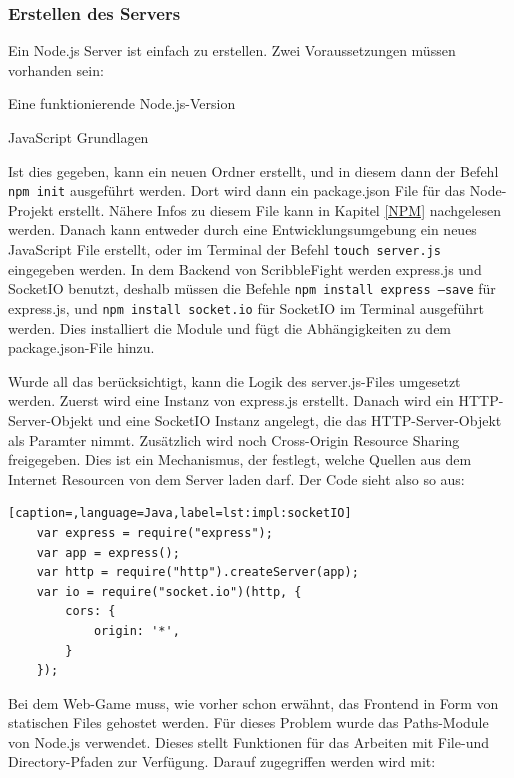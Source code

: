 \subsubsection{Erstellen des Servers}
Ein Node.js Server ist einfach zu erstellen. Zwei Voraussetzungen müssen vorhanden sein:

\begin{compactitem}
    \item Eine funktionierende Node.js-Version
    \item JavaScript Grundlagen
\end{compactitem}

Ist dies gegeben, kann ein neuen Ordner erstellt, und in diesem dann der Befehl \texttt{npm init} ausgeführt werden.
Dort wird dann ein package.json File für das Node-Projekt erstellt. Nähere Infos zu diesem File kann in Kapitel \ref{NPM} nachgelesen werden.
Danach kann entweder durch eine Entwicklungsumgebung ein neues JavaScript File erstellt, oder im Terminal der Befehl \texttt{touch server.js} eingegeben werden.
In dem Backend von ScribbleFight werden express.js und SocketIO benutzt, deshalb müssen die Befehle \texttt{npm install express --save} für express.js, und
\texttt{npm install socket.io} für SocketIO im Terminal ausgeführt werden. Dies installiert die Module und fügt die Abhängigkeiten zu dem package.json-File hinzu.

Wurde all das berücksichtigt, kann die Logik des server.js-Files umgesetzt werden. Zuerst wird eine Instanz von express.js erstellt.
Danach wird ein HTTP-Server-Objekt und eine SocketIO Instanz angelegt, die das HTTP-Server-Objekt als Paramter nimmt. Zusätzlich wird noch Cross-Origin Resource Sharing freigegeben. 
Dies ist ein Mechanismus, der festlegt, welche Quellen aus dem Internet Resourcen von dem Server laden darf. \cite{cors}
Der Code sieht also so aus:

\begin{lstlisting}[caption=,language=Java,label=lst:impl:socketIO]
    var express = require("express");
    var app = express();
    var http = require("http").createServer(app);
    var io = require("socket.io")(http, {
        cors: {
            origin: '*',
        }
    });
\end{lstlisting}

Bei dem Web-Game muss, wie vorher schon erwähnt, das Frontend in Form von statischen Files gehostet werden.
Für dieses Problem wurde das Paths-Module von Node.js verwendet. Dieses stellt Funktionen für das Arbeiten mit File-und Directory-Pfaden zur Verfügung. Darauf zugegriffen werden wird mit:

